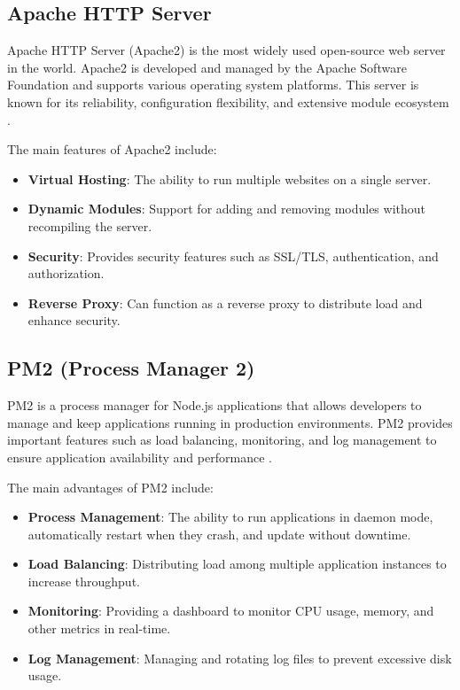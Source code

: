\subsection{\textbf{Apache HTTP Server}}

Apache HTTP Server (Apache2) is the most widely used open-source web server in the world. Apache2 is developed and managed by the Apache Software Foundation and supports various operating system platforms. This server is known for its reliability, configuration flexibility, and extensive module ecosystem \cite{apache2024}.

The main features of Apache2 include:
\begin{itemize}[nolistsep]
  \item \textbf{Virtual Hosting}: The ability to run multiple websites on a single server.
  \item \textbf{Dynamic Modules}: Support for adding and removing modules without recompiling the server.
  \item \textbf{Security}: Provides security features such as SSL/TLS, authentication, and authorization.
  \item \textbf{Reverse Proxy}: Can function as a reverse proxy to distribute load and enhance security.
\end{itemize}

\subsection{\textbf{PM2 (Process Manager 2)}}

PM2 is a process manager for Node.js applications that allows developers to manage and keep applications running in production environments. PM2 provides important features such as load balancing, monitoring, and log management to ensure application availability and performance \cite{pm22024}.

The main advantages of PM2 include:
\begin{itemize}[nolistsep]
  \item \textbf{Process Management}: The ability to run applications in daemon mode, automatically restart when they crash, and update without downtime.
  \item \textbf{Load Balancing}: Distributing load among multiple application instances to increase throughput.
  \item \textbf{Monitoring}: Providing a dashboard to monitor CPU usage, memory, and other metrics in real-time.
  \item \textbf{Log Management}: Managing and rotating log files to prevent excessive disk usage.
\end{itemize}
